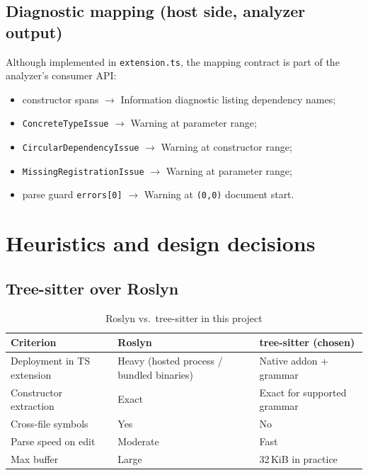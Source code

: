 \subsection{Diagnostic mapping (host side, analyzer output)}

Although implemented in \texttt{extension.ts}, the mapping contract is part of the analyzer's consumer API:
\begin{itemize}
	\item constructor spans $\rightarrow$ Information diagnostic listing dependency names;
	\item \texttt{ConcreteTypeIssue} $\rightarrow$ Warning at parameter range;
	\item \texttt{CircularDependencyIssue} $\rightarrow$ Warning at constructor range;
	\item \texttt{MissingRegistrationIssue} $\rightarrow$ Warning at parameter range;
	\item parse guard \texttt{errors[0]} $\rightarrow$ Warning at \texttt{(0,0)} document start.
\end{itemize}

\section{Heuristics and design decisions}
\label{chap3:heuristics}

\subsection{Tree-sitter over Roslyn}

\begin{table}[htbp]
\centering
\caption{Roslyn vs.\ tree-sitter in this project}
\label{tab:roslyn-vs-ts}
\small
\begin{tabular}{|l|p{5.5cm}|p{5.5cm}|}
\hline
\textbf{Criterion} & \textbf{Roslyn} & \textbf{tree-sitter (chosen)} \\
\hline
Deployment in TS extension & Heavy (hosted process / bundled binaries) & Native addon + grammar \\
\hline
Constructor extraction & Exact & Exact for supported grammar \\
\hline
Cross-file symbols & Yes & No \\
\hline
Parse speed on edit & Moderate & Fast \\
\hline
Max buffer & Large & 32\,KiB in practice \\
\hline
\end{tabular}
\end{table}


